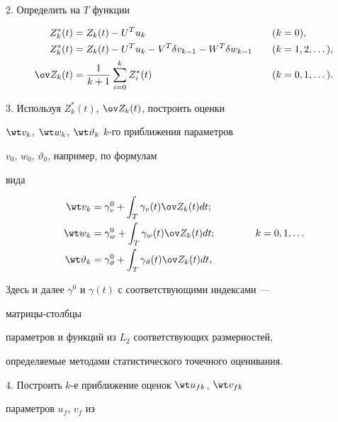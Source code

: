  


2. Определить на $T$ функции 


\begin{alignat}{2} 


Z^*_k(t)&=Z_k(t)-U^T u_k &\quad (k&=0),\notag\\ 


Z^*_k(t)&=Z_k(t)-U^T u_k-V^T\delta v_{k-1}- 


W^T\delta w_{k-1}&\quad (k&=1,2,\dotsc),\\ 


\ov Z_k(t)&=\frac{1}{k+1}\sum^k_{i=0}Z^*_i(t) 


&\quad (k&=0,1,\dotsc). \notag


\end{alignat} 


 


3. Используя $Z^*_k(t)$, $\ov Z_k(t)$, построить оценки 


$\wt v_k$, $\wt w_k$, $\wt\vartheta_k$\; $k$-го приближения параметров 


$v_0$, $w_0$, $\vartheta_0$, например, по формулам 


вида 


\begin{align} 


\wt v_k&=\gamma^0_v+\int_T\gamma_v(t)\ov Z_k(t)dt;\notag\\ 


\wt w_k&=\gamma^0_w+\int_T\gamma_w(t)\ov Z_k(t)dt;\qquad\qquad


k=0,1,\dotsc\\ 


\wt \vartheta_k&=\gamma^0_\vartheta+ 


\int_T\gamma_\vartheta(t)\ov Z_k(t)dt,\notag 


\end{align} 


Здесь и далее $\gamma^0$ и $\gamma(t)$ с соответствующими индексами --- 


матрицы-столбцы 


параметров и функций из $L_2$ соответствующих размерностей, 


определяемые методами статистического точечного оценивания. 


 


4. Построить $k$-е приближение оценок $\wt u_{fk}$, $\wt v_{fk}$ 


параметров $u_f$, $v_f$ из 


